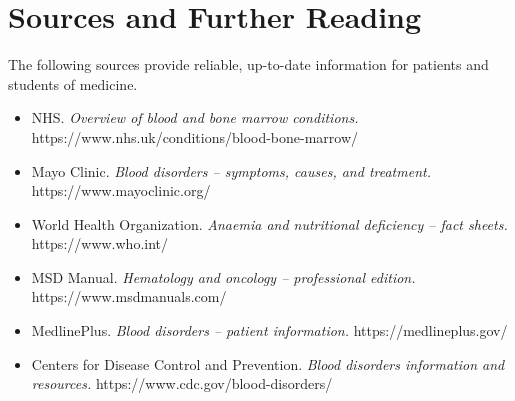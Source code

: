 \section*{Sources and Further Reading}
The following sources provide reliable, up-to-date information for patients and students of medicine.

\begin{itemize}
    \item NHS. \textit{Overview of blood and bone marrow conditions.} https://www.nhs.uk/conditions/blood-bone-marrow/
    \item Mayo Clinic. \textit{Blood disorders -- symptoms, causes, and treatment.} https://www.mayoclinic.org/
    \item World Health Organization. \textit{Anaemia and nutritional deficiency -- fact sheets.} https://www.who.int/
    \item MSD Manual. \textit{Hematology and oncology -- professional edition.} https://www.msdmanuals.com/
    \item MedlinePlus. \textit{Blood disorders -- patient information.} https://medlineplus.gov/
    \item Centers for Disease Control and Prevention. \textit{Blood disorders information and resources.} https://www.cdc.gov/blood-disorders/
\end{itemize}

